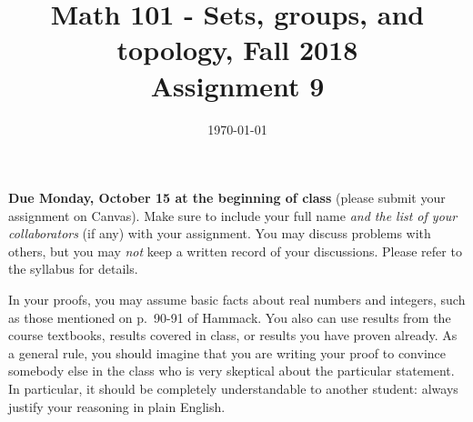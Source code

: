 \documentclass{amsart}
\title[Math 101, Fall 2018: assignment 9]{Math 101 - Sets, groups, and topology, Fall 2018 \\ Assignment 9}
\date{\today}
\theoremstyle{definition}
\begin{document}

\maketitle

\textbf{Due Monday, October 15 at the beginning of class} (please submit your assignment on Canvas). Make sure to include your full name \emph{and the list of your collaborators} (if any) with your assignment. You may discuss problems with others, but you may \emph{not} keep a written record of your discussions. Please refer to the syllabus for details.

In your proofs, you may assume basic facts about real numbers and integers, such as those mentioned on p.~90-91 of Hammack. You also can use results from the course textbooks, results covered in class, or results you have proven already. As a general rule, you should imagine that you are writing your proof to convince somebody else in the class who is very skeptical about the particular statement. In particular, it should be completely understandable to another student: always justify your reasoning in plain English. 
\end{document}

